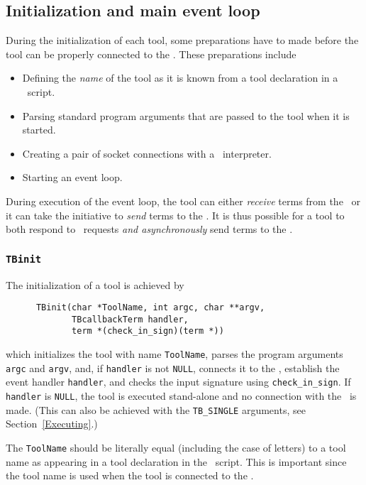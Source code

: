 \subsection{\label{Init}Initialization and main event loop}

During the initialization of each tool, some preparations have to made
before the tool can be properly connected to the \TB. These preparations
include
\begin{itemize}
\item Defining the {\em name} of the tool as it is known from a tool declaration
in a \T\ script.
\item Parsing standard program arguments that are passed to the tool
when it is started.
\item Creating a pair of socket connections with a \TB\ interpreter.
\item Starting an event loop.
\end{itemize}

During execution of the event loop, the tool can either {\em receive} terms from
the \TB\ or it can take the initiative to {\em send} terms to the \TB.
It is thus possible for a tool to both respond to \TB\ requests
{\em and asynchronously} send terms to the \TB.

\subsubsection{\label{TBinit}{\tt TBinit}}

The initialization of a tool is achieved by
\begin{verbatim}
      TBinit(char *ToolName, int argc, char **argv,
             TBcallbackTerm handler,
             term *(check_in_sign)(term *))
\end{verbatim}
which initializes the tool with name {\tt ToolName},
parses the program arguments {\tt argc} and {\tt argv},
and, if {\tt handler} is not {\tt NULL},
connects it to the \TB, establish the event handler {\tt handler},
and checks the input signature using {\tt check\_in\_sign}.
If {\tt handler} is {\tt NULL}, the tool is executed stand-alone
and no connection with the \TB\ is made.
(This can also be achieved with the {\tt TB\_SINGLE} arguments,
see Section~\ref{Executing}.)

The {\tt ToolName} should be literally equal (including the case of letters)
to a tool name as appearing in
a tool declaration in the \T\ script. This is important since the tool name
is used when the tool is connected to the \TB.

